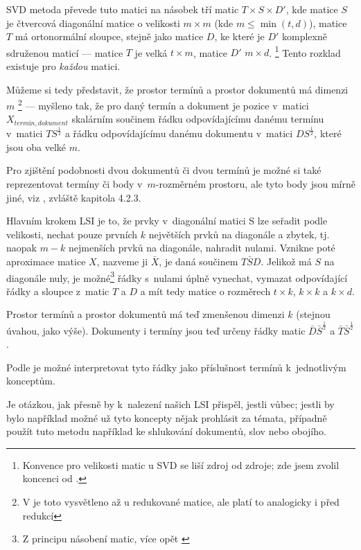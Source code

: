 \documentclass[12pt,a4paper]{report}
\begin{document}
SVD metoda převede tuto matici na násobek tří matic $T\times S \times D'$, kde matice $S$ je čtvercová diagonální matice o velikosti $m\times m$ (kde $m\le \min\left(t, d\right)$), matice $T$ má ortonormální sloupce, stejně jako matice $D$, ke které je $D'$ komplexně sdruženou maticí --- matice $T$ je velká $t \times m$, matice $D'$ $m \times d$. \footnote{Konvence pro velikosti matic u SVD se liší zdroj od zdroje; zde jsem zvolil koncenci od \cite{lsi}.} Tento rozklad existuje pro \emph{každou} matici.

Můžeme si tedy představit, že prostor termínů a prostor dokumentů má dimenzi $m$ \footnote{V \cite{lsi} je toto vysvětleno až u redukované matice, ale platí to analogicky i před redukcí} --- myšleno tak, že pro daný termín a dokument je pozice v~matici $X_{termín, dokument}$ skalárním součinem řádku odpovídajícímu danému termínu v~matici $TS^{\frac{1}{2}}$ a řádku odpovídajícímu danému dokumentu v~matici $DS^{\frac{1}{2}}$, které jsou oba velké $m$. 

Pro zjištění podobnosti dvou dokumentů či dvou termínů je možné si také reprezentovat termíny či body v~$m$-rozměrném prostoru, ale tyto body jsou mírně jiné, viz \cite{lsi}, zvláště kapitola 4.2.3.

Hlavním krokem LSI je to, že prvky v~diagonální matici S lze seřadit podle velikosti, nechat pouze prvních $k$ největších prvků na diagonále a zbytek, tj. naopak $m-k$ nejmenších prvků na diagonále, nahradit nulami. Vznikne poté aproximace matice $X$, nazveme ji $\bar{X}$, je daná součinem $T\bar{S}D$. Jelikož má $S$ na diagonále nuly, je možné\footnote{Z principu násobení matic, více opět \cite{lsi}} řádky s~nulami úplně vynechat, vymazat odpovídající řádky a sloupce z~matic $T$ a $D$ a mít tedy matice o rozměrech $t \times k$, $k \times k$ a $k \times d$.

Prostor termínů a prostor dokumentů má teď zmenšenou dimenzi $k$ (stejnou úvahou, jako výše). Dokumenty i termíny jsou teď určeny řádky matic $\bar{D}\bar{S}^{\frac{1}{2}}$ a $\bar{T}\bar{S}^{\frac{1}{2}}$.

Podle \cite{lsi} je možné interpretovat tyto řádky jako příslušnost termínů k~jednotlivým konceptům.

Je otázkou, jak přesně by k~nalezení našich  LSI přispěl, jestli vůbec; jestli by bylo například možné už tyto koncepty nějak prohlásit za témata, případně použít tuto metodu například ke shlukování dokumentů, slov nebo obojího.

\end{document}
